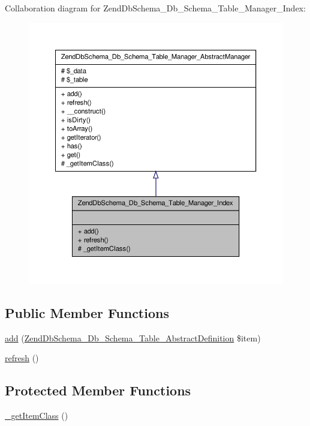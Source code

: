 \-Collaboration diagram for \-Zend\-Db\-Schema\-\_\-\-Db\-\_\-\-Schema\-\_\-\-Table\-\_\-\-Manager\-\_\-\-Index\-:\nopagebreak
\begin{figure}[H]
\begin{center}
\leavevmode
\includegraphics[width=350pt]{classZendDbSchema__Db__Schema__Table__Manager__Index__coll__graph}
\end{center}
\end{figure}
\subsection*{\-Public \-Member \-Functions}
\begin{DoxyCompactItemize}
\item 
\hyperlink{classZendDbSchema__Db__Schema__Table__Manager__Index_aad5593d15638018cb662002f35f1a975}{add} (\hyperlink{classZendDbSchema__Db__Schema__Table__AbstractDefinition}{\-Zend\-Db\-Schema\-\_\-\-Db\-\_\-\-Schema\-\_\-\-Table\-\_\-\-Abstract\-Definition} \$item)
\item 
\hyperlink{classZendDbSchema__Db__Schema__Table__Manager__Index_ae736a0eff081db2c7de80e635021ccc9}{refresh} ()
\end{DoxyCompactItemize}
\subsection*{\-Protected \-Member \-Functions}
\begin{DoxyCompactItemize}
\item 
\hyperlink{classZendDbSchema__Db__Schema__Table__Manager__Index_abf682839df69cd725db24701e901458f}{\-\_\-get\-Item\-Class} ()
\end{DoxyCompactItemize}


